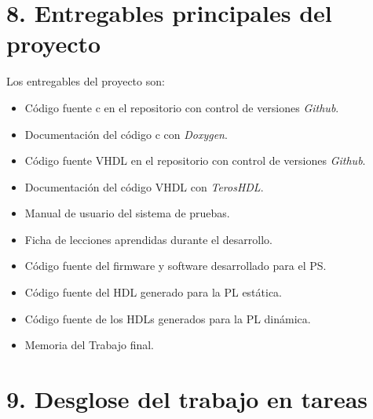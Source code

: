 \documentclass[
11pt, %
]{charter}
\begin{document}
\clearpage

\section{8. Entregables principales del proyecto}
\label{sec:entregables}

Los entregables del proyecto son:

\begin{itemize}
	\item Código fuente c en el repositorio con control de versiones \emph{Github}.
	\item Documentación del código c con \emph{Doxygen}.
	\item Código fuente VHDL en el repositorio con control de versiones \emph{Github}.
	\item Documentación del código VHDL con \emph{TerosHDL}.
	\item Manual de usuario del sistema de pruebas.
	\item Ficha de lecciones aprendidas durante el desarrollo.
	\item Código fuente del firmware y software desarrollado para el PS.
	\item Código fuente del HDL generado para la PL estática.
	\item Código fuente de los HDLs generados para la PL dinámica.
	\item Memoria del Trabajo final.
\end{itemize}

\clearpage

\section{9. Desglose del trabajo en tareas}
\label{sec:wbs}
\end{document}
